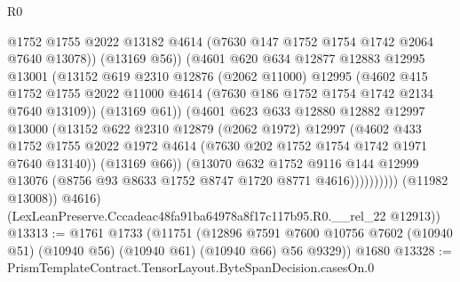 \begin{lexlean}{R0}
\begin{coremodule}
                          @1752
                          @1755
                          @2022
                          @13182
                          @4614
                          (@7630 @147 @1752 @1754 @1742 @2064 @7640 @13078))
                        (@13169 @56))
                      (@4601
                        @620
                        @634
                        @12877
                        @12883
                        @12995
                        @13001
                        (@13152
                          @619
                          @2310
                          @12876
                          (@2062 @11000)
                          @12995
                          (@4602
                            @415
                            @1752
                            @1755
                            @2022
                            @11000
                            @4614
                            (@7630 @186 @1752 @1754 @1742 @2134 @7640 @13109))
                          (@13169 @61))
                        (@4601
                          @623
                          @633
                          @12880
                          @12882
                          @12997
                          @13000
                          (@13152
                            @622
                            @2310
                            @12879
                            (@2062 @1972)
                            @12997
                            (@4602
                              @433
                              @1752
                              @1755
                              @2022
                              @1972
                              @4614
                              (@7630 @202 @1752 @1754 @1742 @1971 @7640 @13140))
                            (@13169 @66))
                          (@13070
                            @632
                            @1752
                            @9116
                            @144
                            @12999
                            @13076
                            (@8756 @93 @8633 @1752 @8747 @1720 @8771 @4616))))))))))
          (@11982 @13008))
        @4616)
      (LexLeanPreserve.Cccadeac48fa91ba64978a8f17c117b95.R0.__rel_22 @12913))
@13313 := @1761
    @1733
    (@11751
      (@12896
        @7591
        @7600
        @10756
        @7602
        (@10940 @51)
        (@10940 @56)
        (@10940 @61)
        (@10940 @66)
        @56
        @9329))
    @1680
@13328 := PrismTemplateContract.TensorLayout.ByteSpanDecision.casesOn.{0}

\end{coremodule}
\end{lexlean}

